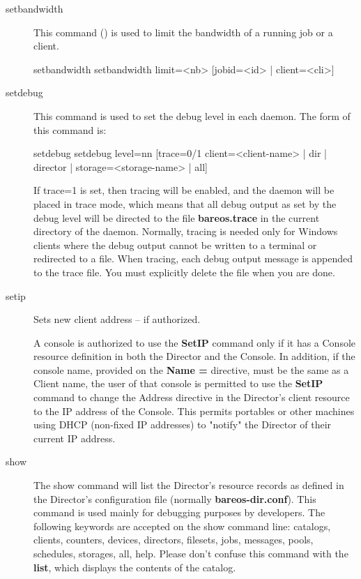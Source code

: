 \begin{description}
\item[setbandwidth]
  This command () is used to limit the bandwidth of a running job or a client.

\begin{bconsole}{setbandwidth}
setbandwidth limit=<nb> [jobid=<id> | client=<cli>]
\end{bconsole}


\item [setdebug]
   This command is used to set the debug level in each  daemon. The form of this
   command is:

\begin{bconsole}{setdebug}
setdebug level=nn [trace=0/1 client=<client-name> | dir | director | storage=<storage-name> | all]
\end{bconsole}

   If trace=1 is set, then tracing will be enabled, and the daemon will be
   placed in trace mode, which means that all debug output as set by the
   debug level will be directed to the file {\bf bareos.trace} in the
   current directory of the daemon.  Normally, tracing is needed only for
   Windows clients where the debug output cannot be written to a terminal or
   redirected to a file.  When tracing, each debug output message is
   appended to the trace file.  You must explicitly delete the file when
   you are done.

\item [setip]
   Sets new client address -- if authorized.

   A console is authorized to use the {\bf SetIP} command only if it has a
   Console resource definition in both the Director and the Console.  In
   addition, if the console name, provided on the {\bf Name =} directive,
   must be the same as a Client name, the user of that console is permitted
   to use the {\bf SetIP} command to change the Address directive in the
   Director's client resource to the IP address of the Console.  This
   permits portables or other machines using DHCP (non-fixed IP addresses)
   to "notify" the Director of their current IP address.

\item [show]
   The show command will list the Director's resource records as defined in
   the Director's configuration file (normally {\bf bareos-dir.conf}).
   This command is used mainly for debugging purposes by developers.
   The following keywords are accepted on the
   show command line: catalogs, clients, counters, devices, directors,
   filesets, jobs, messages, pools, schedules, storages, all, help.
   Please don't confuse this command
   with the {\bf list}, which displays the contents of the catalog.


\end{description}
